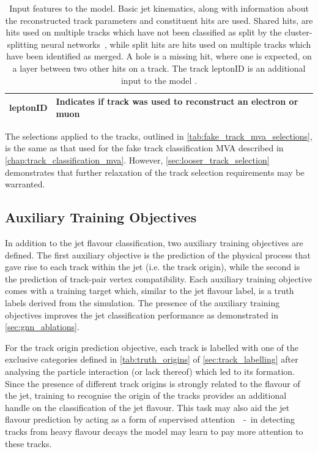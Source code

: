 \begin{table}[!htbp]
\begin{tabular}{ll}
    leptonID   & Indicates if track was used to reconstruct an electron or muon \\
    \hline\bottomrule
  \end{tabular}
  \caption{
    Input features to the \GNN model.
    Basic jet kinematics, along with information about the reconstructed track parameters and constituent hits are used.
    Shared hits, are hits used on multiple tracks which have not been classified as split by the cluster-splitting neural networks~\cite{PERF-2015-08}, while split hits are hits used on multiple tracks which have been identified as merged.
    A hole is a missing hit, where one is expected, on a layer between two other hits on a track.
    The track leptonID is an additional input to the \GNNLep model \cite{ATL-PHYS-PUB-2022-027}.
  }
  \label{tab:track_inputs}
\end{table}

The selections applied to the tracks, outlined in \cref{tab:fake_track_mva_selections}, is the same as that used for the fake track classification MVA described in \cref{chap:track_classification_mva}.
However, \cref{sec:looser_track_selection} demonstrates that further relaxation of the track selection requirements may be warranted. 

\subsection{Auxiliary Training Objectives}\label{sec:aux-train-objectives}

In addition to the jet flavour classification, two auxiliary training objectives are defined.
The first auxiliary objective is the prediction of the physical process that gave rise to each track within the jet (i.e. the track origin), while the second is the prediction of track-pair vertex compatibility. 
Each auxiliary training objective comes with a training target which, similar to the jet flavour label, is a truth labels derived from the simulation.
The presence of the auxiliary training objectives improves the jet classification performance as demonstrated in \cref{sec:gnn_ablations}.

For the track origin prediction objective, each track is labelled with one of the exclusive categories defined in \cref{tab:truth_origins} of \cref{sec:track_labelling} after analysing the particle interaction (or lack thereof) which led to its formation. 
Since the presence of different track origins is strongly related to the flavour of the jet, training \GNN to recognise the origin of the tracks provides an additional handle on the classification of the jet flavour.
This task may also aid the jet flavour prediction by acting as a form of supervised attention~\cite{arxiv.2007.08294}~-~in detecting tracks from heavy flavour decays the model may learn to pay more attention to these tracks.


